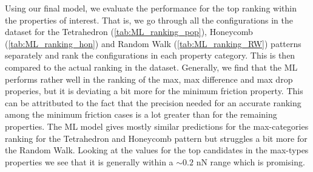 Using our final model, we evaluate the performance for the top ranking within
the properties of interest. That is, we go through all the configurations in the
dataset for the Tetrahedron (\cref{tab:ML_ranking_pop}), Honeycomb
(\cref{tab:ML_ranking_hon}) and Random Walk (\cref{tab:ML_ranking_RW}) patterns
separately and rank the configurations in each property category. This is then compared to the actual ranking in the dataset. Generally, we find that the \acrshort{ML} performs rather well in the ranking of the max, max difference and max drop properies, but it is deviating a bit more for the minimum friction property. This can be attritbuted to the fact that the precision needed for an accurate ranking among the minimum friction cases is a lot greater than for the remaining properties. The \acrshort{ML} model gives mostly similar predictions for the max-categories ranking for the Tetrahedron and Honeycomb pattern but struggles a bit more for the Random Walk. Looking at the values for the top candidates in the max-types properties we see that it is generally within a $\sim 0.2$ nN range which is promising. 

